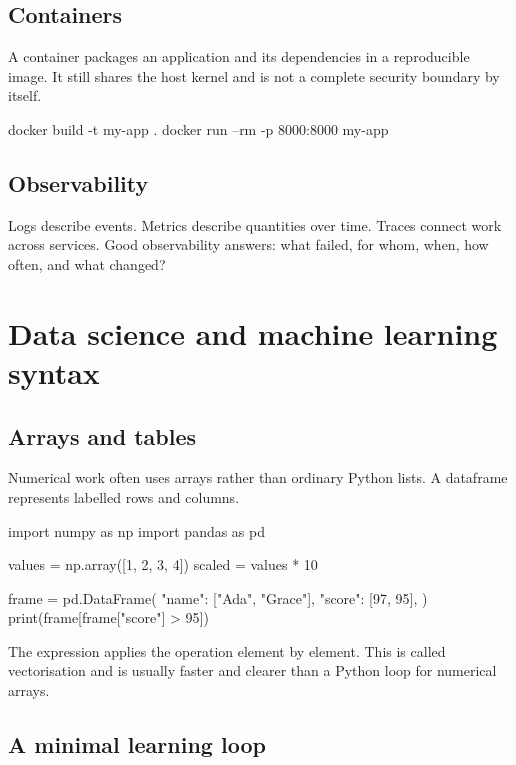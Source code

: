 \documentclass[11pt,openany,oneside]{book}
\newcommand{\inlinecode}[1]{\texttt{\small\detokenize{#1}}}
\begin{document}
\section{Containers}

A container packages an application and its dependencies in a reproducible image. It still shares the host kernel and is not a complete security boundary by itself.

\begin{code}[language=bash]
docker build -t my-app .
docker run --rm -p 8000:8000 my-app
\end{code}

\section{Observability}

Logs describe events. Metrics describe quantities over time. Traces connect work across services. Good observability answers: what failed, for whom, when, how often, and what changed?

\chapter{Data science and machine learning syntax}

\section{Arrays and tables}

Numerical work often uses arrays rather than ordinary Python lists. A dataframe represents labelled rows and columns.

\begin{code}[language=Python]
import numpy as np
import pandas as pd

values = np.array([1, 2, 3, 4])
scaled = values * 10

frame = pd.DataFrame({
    "name": ["Ada", "Grace"],
    "score": [97, 95],
})
print(frame[frame["score"] > 95])
\end{code}

The expression \inlinecode{values * 10} applies the operation element by element. This is called vectorisation and is usually faster and clearer than a Python loop for numerical arrays.

\section{A minimal learning loop}
\end{document}
